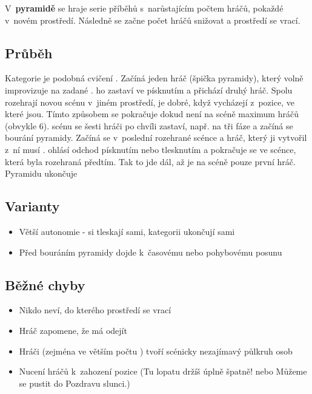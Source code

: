 V~\textbf{pyramidě} se hraje serie příběhů s~narůstajícím počtem hráčů, pokaždé v~novém prostředí. Následně se začne počet hráčů snižovat a prostředí se vrací. 
 
 
\subsection{ Průběh } Kategorie je podobná cvičení . Začíná jeden hráč (špička pyramidy), který volně improvizuje na zadané .  ho zastaví ve  písknutím a přichází druhý hráč. Spolu rozehrají novou scénu v~jiném prostředí, je dobré, když vycházejí z~pozice, ve které jsou. Tímto způsobem se pokračuje dokud není na scéně maximum hráčů (obvykle 6). 
 scénu se šesti hráči po chvíli zastaví,  např. na tři fáze   a začíná se bourání pyramidy. Začíná se v~poslední rozehrané scénce a hráč, který ji vytvořil z~ní musí .  ohlásí odchod písknutím nebo tlesknutím a pokračuje se ve scénce, která byla rozehraná předtím. Tak to jde dál, až je na scéně pouze první hráč. Pyramidu ukončuje  
 
\subsection{ Varianty } \begin{itemize}
\item Větší autonomie -  si tleskají sami, kategorii ukončují sami
\item Před bouráním pyramidy dojde k~časovému nebo pohybovému posunu
\end{itemize}
 
\subsection{ Běžné chyby } \begin{itemize}
\item  Nikdo neví, do kterého prostředí se vrací
\item  Hráč zapomene, že má odejít
\item  Hráči (zejména ve větším počtu ) tvoří scénicky nezajímavý půlkruh osob
\item  Nucení hráčů k~zahození pozice (Tu lopatu držíš úplně špatně! nebo Můžeme se pustit do Pozdravu slunci.)
\end{itemize}
 
